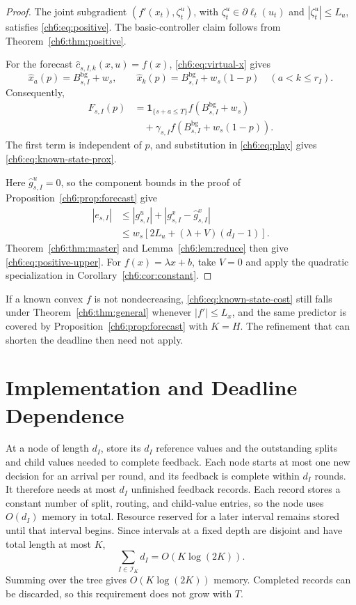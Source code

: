 \documentclass[11pt]{article}
\newcommand{\ind}[1]{\mathbf{1}_{\{#1\}}}
\theoremstyle{plain}
\theoremstyle{remark}
\numberwithin{equation}{section}
\begin{document}
\begin{proof}
The joint subgradient $(f'(x_t),\zeta_t^u)$, with
$\zeta_t^u\in\partial\ell_t(u_t)$ and $|\zeta_t^u|\le L_u$, satisfies
\eqref{ch6:eq:positive}.  The basic-controller claim follows from
Theorem~\ref{ch6:thm:positive}.

For the forecast $\widehat c_{s,I,k}(x,u)=f(x)$,
\eqref{ch6:eq:virtual-x} gives
\[
\widehat x_a(p)=B_{s,I}^{\mathrm{bg}}+w_s,
\qquad
\widehat x_k(p)=B_{s,I}^{\mathrm{bg}}+w_s(1-p)
\quad(a<k\le r_I).
\]
Consequently,
\begin{align*}
F_{s,I}(p)
&=\ind{s+a\le T}f(B_{s,I}^{\mathrm{bg}}+w_s)\\
&\quad+\gamma_{s,I}
 f(B_{s,I}^{\mathrm{bg}}+w_s(1-p)).
\end{align*}
The first term is independent of $p$, and substitution in
\eqref{ch6:eq:play} gives \eqref{ch6:eq:known-state-prox}.

Here $\widehat g_{s,I}^u=0$, so the component bounds in the proof of
Proposition~\ref{ch6:prop:forecast} give
\begin{align*}
|e_{s,I}|
&\le|g_{s,I}^u|
  +|g_{s,I}^x-\widehat g_{s,I}^x|\\
&\le w_s[2L_u+(\lambda+V)(d_I-1)].
\end{align*}
Theorem~\ref{ch6:thm:master} and Lemma~\ref{ch6:lem:reduce} then give
\eqref{ch6:eq:positive-upper}.
For $f(x)=\lambda x+b$, take $V=0$ and apply the quadratic specialization
in Corollary~\ref{ch6:cor:constant}.
\end{proof}

If a known convex
$f$ is not nondecreasing, \eqref{ch6:eq:known-state-cost} still falls under
Theorem~\ref{ch6:thm:general} whenever $|f'|\le L_x$, and the same
predictor is covered by Proposition~\ref{ch6:prop:forecast} with $K=H$.
The refinement that can shorten the deadline then need not apply.

\section{Implementation and Deadline Dependence}
\label{ch6:sec:implementation}
At a node of length $d_I$, store its $d_I$ reference values and the outstanding
splits and child values needed to complete feedback. Each node starts at
most one new decision for an arrival per round, and its feedback is complete
within $d_I$ rounds. It therefore needs at most $d_I$ unfinished feedback
records. Each record stores a constant number of split, routing, and
child-value entries, so the node uses $O(d_I)$ memory in total. Resource
reserved for a later interval remains stored until that interval begins.
Since intervals at a fixed depth are disjoint and have total length at most $K$,
\begin{equation}\label{ch6:eq:memory}
 \sum_{I\in\mathcal{I}_K}d_I=O(K\log(2K)).
\end{equation}
Summing over the tree gives $O(K\log(2K))$ memory. Completed records can
be discarded, so this requirement does not grow with $T$.
\end{document}
